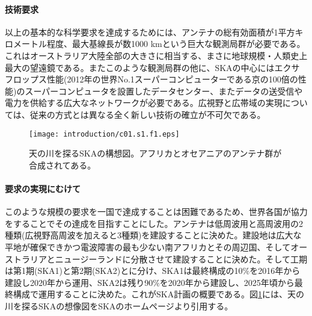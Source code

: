 \paragraph{技術要求}

以上の基本的な科学要求を達成するためには、アンテナの総有効面積が1平方キロメートル程度、最大基線長が数1000 kmという巨大な観測局群が必要である。これはオーストラリア大陸全部の大きさに相当する、まさに地球規模・人類史上最大の望遠鏡である。またこのような観測局群の他に、SKAの中心にはエクサフロップス性能(2012年の世界No.1スーパーコンピューターである京の100倍の性能)のスーパーコンピュータを設置したデータセンター、またデータの送受信や電力を供給する広大なネットワークが必要である。広視野と広帯域の実現については、従来の方式とは異なる全く新しい技術の確立が不可欠である。

\begin{figure}[tbp]
\begin{center}
\texttt{[image: introduction/c01.s1.f1.eps]}
\caption{天の川を探るSKAの構想図。アフリカとオセアニアのアンテナ群が合成されてある。
}\label{c01.s1.f1}
\end{center}
\end{figure}

\paragraph{要求の実現にむけて}

このような規模の要求を一国で達成することは困難であるため、世界各国が協力をすることでその達成を目指すことにした。アンテナは低周波用と高周波用の2種類(広視野高周波を加えると3種類)を建設することに決めた。建設地は広大な平地が確保できかつ電波障害の最も少ない南アフリカとその周辺国、そしてオーストラリアとニュージーランドに分散させて建設することに決めた。そして工期は第1期(SKA1)と第2期(SKA2)とに分け、SKA1は最終構成の10\%を2016年から建設し2020年から運用、SKA2は残り90\%を2020年から建設し、2025年頃から最終構成で運用することに決めた。これがSKA計画の概要である。図\ref{c01.s1.f1}には、天の川を探るSKAの想像図をSKAのホームページより引用する。
